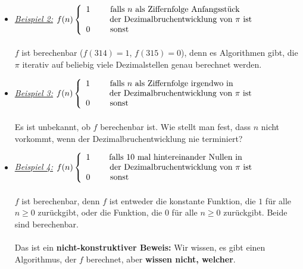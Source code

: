 \documentclass[ieeetran]{article}
\begin{document}
\begin{itemize}
\begin{itemize}
	\end{itemize}
	\item \textit{\underline{Beispiel 2:}} \begin{math}
		f(n) \left\{
			\begin{array}{ll}
				1 & \hspace{-6.35cm} \mbox{falls $n$ als Ziffernfolge Anfangsstück}\\ \hspace{1cm}\mbox{der Dezimalbruchentwicklung von $\pi$ ist}\\
				0 & \hspace{-6.35cm}\mbox{sonst}
		\end{array}
		\right.
	\end{math}
\\\\ $f$ ist berechenbar ($f(314) = 1$, $f(315) = 0$), denn es Algorithmen gibt, die $\pi$ iterativ auf beliebig viele Dezimalstellen genau berechnet werden.
		
\item \textit{\underline{Beispiel 3:}} \begin{math}
		f(n) \left\{
			\begin{array}{ll}
				1 & \hspace{-6.35cm} \mbox{falls $n$ als Ziffernfolge irgendwo in}\\ \hspace{1cm}\mbox{der Dezimalbruchentwicklung von $\pi$ ist}\\
				0 & \hspace{-6.35cm}\mbox{sonst}
		\end{array}
		\right.
	\end{math}
\\\\ Es ist unbekannt, ob $f$ berechenbar ist. Wie stellt man fest, dass $n$ nicht vorkommt, wenn der Dezimalbruchentwicklung nie terminiert?

\pagebreak

\item \textit{\underline{Beispiel 4:}} \begin{math}
		f(n) \left\{
			\begin{array}{ll}
				1 & \hspace{-6.4cm} \mbox{falls 10 mal hintereinander Nullen in}\\ \hspace{1cm}\mbox{der Dezimalbruchentwicklung von $\pi$ ist}\\
				0 & \hspace{-6.35cm}\mbox{sonst}
		\end{array}
		\right.
	\end{math}
\\\\ $f$ ist berechenbar, denn $f$ ist entweder die konstante Funktion, die $1$ für alle $n\ge0$ zurückgibt, oder die Funktion, die $0$ für alle $n\ge 0$ zurückgibt. Beide sind berechenbar.
\\\\ Das ist ein \textbf{nicht-konstruktiver Beweis:} Wir wissen, es gibt einen Algorithmus, der $f$ berechnet, aber \textbf{wissen nicht, welcher}.


\end{itemize}
\end{document}
